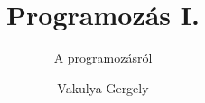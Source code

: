 \documentclass[
	11pt, %
]{beamer}
\title{Programozás I.}
\subtitle{A programozásról}
\author{Vakulya Gergely}
\institute[UC]{Óbudai Egyetem, AMK \\ \smallskip \textit{vakulya.gergely@amk.uni-obuda.hu}}
\date{}
\begin{document}
\begin{frame}

  \titlepage

\end{frame}

\begin{frame}


\end{frame}
\end{document}
